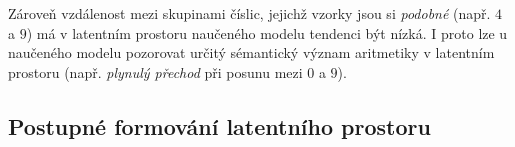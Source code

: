 Zároveň vzdálenost mezi skupinami číslic, jejichž vzorky jsou si \emph{podobné} (např. $4$ a $9$) má v latentním prostoru naučeného modelu tendenci být nízká.
I proto lze u naučeného modelu pozorovat určitý sémantický význam aritmetiky v latentním prostoru (např. \emph{plynulý přechod} při posunu mezi $0$ a $9$).

\subsection{Postupné formování latentního prostoru}
\label{sec:latent_space_development}

\begin{figure}[H]
    \centering

\end{figure}
